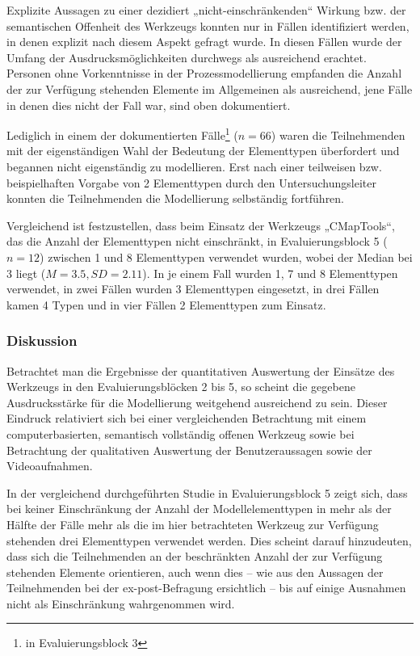 Explizite Aussagen zu einer dezidiert „nicht-einschränkenden“ Wirkung bzw. der semantischen Offenheit des Werkzeugs konnten nur in Fällen identifiziert werden, in denen explizit nach diesem Aspekt gefragt wurde. In diesen Fällen wurde der Umfang der Ausdrucksmöglichkeiten durchwegs als ausreichend erachtet. Personen ohne Vorkenntnisse in der Prozessmodellierung empfanden die Anzahl der zur Verfügung stehenden Elemente im Allgemeinen als ausreichend, jene Fälle in denen dies nicht der Fall war, sind oben dokumentiert.

Lediglich in einem der dokumentierten Fälle\footnote{in Evaluierungsblock 3} ($n=66$) waren die Teilnehmenden mit der eigenständigen Wahl der Bedeutung der Elementtypen überfordert und begannen nicht eigenständig zu modellieren. Erst nach einer teilweisen bzw. beispielhaften Vorgabe von 2 Elementtypen durch den Untersuchungsleiter konnten die Teilnehmenden die Modellierung selbständig fortführen. 

Vergleichend ist festzustellen, dass beim Einsatz der Werkzeugs „CMapTools“, das die Anzahl der Elementtypen nicht einschränkt, in Evaluierungsblock 5 ($n=12$) zwischen 1 und 8 Elementtypen verwendet wurden, wobei der Median bei 3 liegt ($M=3.5, SD=2.11$). In je einem Fall wurden 1, 7 und 8 Elementtypen verwendet, in zwei Fällen wurden 3 Elementtypen eingesetzt, in drei Fällen kamen 4 Typen und in vier Fällen 2 Elementtypen zum Einsatz.

\subsubsection{Diskussion} %

Betrachtet man die Ergebnisse der quantitativen Auswertung der Einsätze des Werkzeugs in den Evaluierungsblöcken 2 bis 5, so scheint die gegebene Ausdrucksstärke für die Modellierung weitgehend ausreichend zu sein. Dieser Eindruck relativiert sich bei einer vergleichenden Betrachtung mit einem computerbasierten, semantisch vollständig offenen Werkzeug sowie bei Betrachtung der qualitativen Auswertung der Benutzeraussagen sowie der Videoaufnahmen. 

In der vergleichend durchgeführten Studie in Evaluierungsblock 5 zeigt sich, dass bei keiner Einschränkung der Anzahl der Modellelementtypen in mehr als der Hälfte der Fälle mehr als die im hier betrachteten Werkzeug zur Verfügung stehenden drei Elementtypen verwendet werden. Dies scheint darauf hinzudeuten, dass sich die Teilnehmenden an der beschränkten Anzahl der zur Verfügung stehenden Elemente orientieren, auch wenn dies -- wie aus den Aussagen der Teilnehmenden bei der ex-post-Befragung ersichtlich -- bis auf einige Ausnahmen nicht als Einschränkung wahrgenommen wird.

